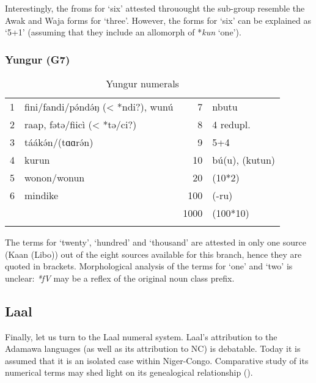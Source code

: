 Interestingly, the froms for ‘six’ attested throuought the sub-group resemble the Awak and Waja forms for ‘three’. However, the forms for ‘six’ can be explained as ‘5+1’ (assuming that they include an allomorph of *\textit{kun} ‘one’).

\subsubsection{Yungur (G7)}%
\begin{table}
\caption{\label{tab:3:115}Yungur numerals}


\begin{tabularx}{\textwidth}{llrX}
\lsptoprule

1 & fini/fandi/p{\'{ə}}nd{\'{ə}}ŋ (< *ndi?), wunú & 7 & nbutu\\
2 & raap, fətə/fiicì (< *tə/ci?) & 8 & 4 redupl.\\
3 & táák{\'{ə}}n/(tɑɑr{\'{ə}}n) & 9 & 5+4\\
4 & kurun & 10 & bú(u), (kutun)\\
5 & wonon/wonun & 20 & (10*2)\\
6 & mindike & 100 & (-ru)\\
&  & 1000 & (100*10)\\
\lspbottomrule
\end{tabularx}
\end{table}

The terms for ‘twenty’, ‘hundred’ and ‘thousand’ are attested in only one source (Kaan (Libo)) out of the eight sources available for this branch, hence they are quoted in brackets. Morphological analysis of the terms for ‘one’ and ‘two’ is unclear: \textit{*fV} may be a reflex of the original noun class prefix.


\subsection{Laal}%
Finally, let us turn to the Laal numeral system. Laal’s attribution to the Adamawa languages (as well as its attribution to NC) is debatable. Today it is assumed that it is an isolated case within Niger-Congo. Comparative study of its numerical terms may shed light on its genealogical relationship (). 

